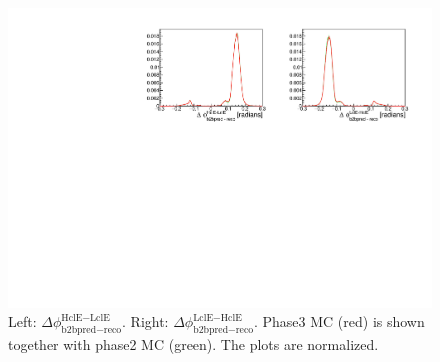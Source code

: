 \documentclass[a4paper,11pt,twosided,final,german,openbib,pdftex,listof=totoc,bibliography=totoc]{scrbook}
\begin{document}
\begin{appendix}
\begin{figure}[h!]
	\centering
	\includegraphics[width=\textwidth]{Plots/comp/cb2bMC.pdf}
	\caption[Normalized b2bClusterPhi - clusterPhi For Phase3 MC And Phase3 MC]{Left: $\Delta \phi _{\textrm{b2bpred} - \textrm{reco}}^{\textrm{HclE}-\textrm{LclE}}$. Right:  $\Delta \phi _{\textrm{b2bpred} - \textrm{reco}}^{\textrm{LclE}-\textrm{HclE}}$. Phase3 MC (red) is shown together with phase2 MC (green). The plots are  normalized.}
	\label{fig:Cb2bMC}
\end{figure}

\end{appendix}
\end{document}
